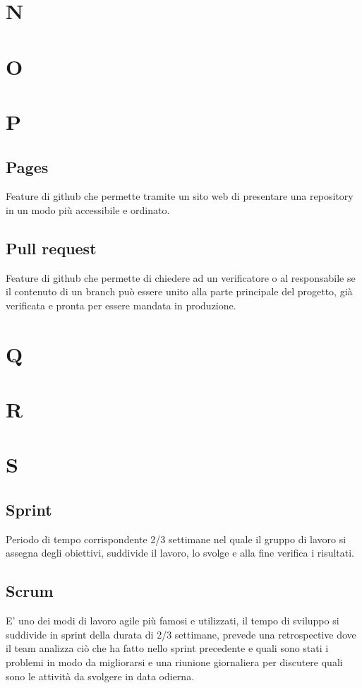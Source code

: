 \section{N}
\section{O}
\section{P}
    \subsection{Pages}
    Feature di github che permette tramite un sito web di presentare una repository in un modo più accessibile e ordinato.
    \subsection{Pull request}
    Feature di github che permette di chiedere ad un verificatore o al responsabile se il contenuto di un branch può
    essere unito alla parte principale del progetto, già verificata e pronta per essere mandata in produzione.

\section{Q}
\section{R}
\section{S}
    \subsection{Sprint}
    Periodo di tempo corrispondente 2/3 settimane nel quale il gruppo di lavoro si assegna degli 
    obiettivi, suddivide il lavoro, lo svolge e alla fine verifica i risultati.
    \subsection{Scrum}
    E' uno dei modi di lavoro agile più famosi e utilizzati, il tempo di sviluppo si suddivide in sprint della durata di 2/3 settimane,
    prevede una retrospective dove il team analizza ciò che ha fatto nello sprint precedente e quali sono stati i problemi in modo da migliorarsi
    e una riunione giornaliera per discutere quali sono le attività da svolgere in data odierna.

